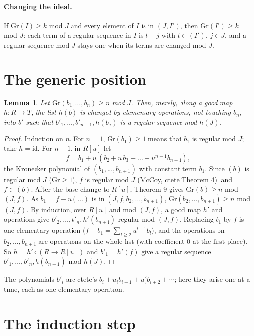 \documentclass[11pt]{amsart}
\newtheorem{lemma}[theorem]{Lemma}
\theoremstyle{remark}
\newcommand{\Gr}{\mathrm{Gr}}
\begin{document}
\paragraph{Changing the ideal.}  If $\Gr(I)\geq k$ mod $J$ and every
element of $I$ is in $(J,I')$, then $\Gr(I')\geq k$ mod $J$: each term of
a regular sequence in $I$ is $t+j$ with $t\in(I')$, $j\in J$, and a
regular sequence mod $J$ stays one when its terms are changed mod $J$.

\section{The generic position}

\begin{lemma}\label{lem:generic}
Let $\Gr(b_1,\dots,b_n)\geq n$ mod $J$.  Then, merely, along a good map
$h:R\to T$, the list $h(b)$ is changed by elementary operations, not
touching $b_n$, into $b'$ such that $b'_1,\dots,b'_{n-1},h(b_n)$ is a
regular sequence mod $h(J)$.
\end{lemma}

\begin{proof}
Induction on $n$.  For $n=1$, $\Gr(b_1)\geq 1$ means that $b_1$ is regular
mod $J$; take $h=\mathrm{id}$.  For $n+1$, in $R[u]$ let
\[
f=b_1+u\,(b_2+u\,b_3+\dots+u^{n-1}b_{n+1}),
\]
the Kronecker polynomial of $(b_1,\dots,b_{n+1})$ with constant term $b_1$.
Since $(b)$ is regular mod $J$ ($\Gr\geq1$), $f$ is regular mod $J$
(McCoy, ctete Theorem 4), and $f\in(b)$.  After the base change to $R[u]$,
Theorem 9 gives $\Gr(b)\geq n$ mod $(J,f)$.  As $b_1=f-u(\dots)$ is in
$(J,f,b_2,\dots,b_{n+1})$, $\Gr(b_2,\dots,b_{n+1})\geq n$ mod $(J,f)$.  By
induction, over $R[u]$ and mod $(J,f)$, a good map $h'$ and operations
give $b'_2,\dots,b'_n,h'(b_{n+1})$ regular mod $(J,f)$.  Replacing $b_1$
by $f$ is one elementary operation ($f-b_1=\sum_{l\geq2}u^{l-1}b_l$), and
the operations on $b_2,\dots,b_{n+1}$ are operations on the whole list
(with coefficient $0$ at the first place).  So $h=h'\circ(R\to R[u])$ and
$b'_1=h'(f)$ give a regular sequence $b'_1,\dots,b'_n,h(b_{n+1})$
mod $h(J)$.
\end{proof}

The polynomials $b'_i$ are ctete's $b_i+u_ib_{i+1}+u_i^2b_{i+2}+\cdots$;
here they arise one at a time, each as one elementary operation.

\section{The induction step}
\end{document}
